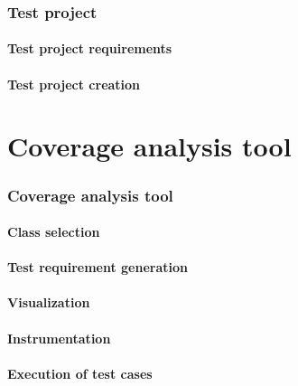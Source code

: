 \documentclass[utf8, english, usepdftitle=false, svgnames, color="table, fixpdftex,  fixinclude, xcdraw", t]{beamer}
\begin{document}
\section{Test project}


\subsection{Test project requirements}


\subsection{Test project creation}




%
\part{Coverage analysis tool}
\section{Coverage analysis tool}


\subsection{Class selection}


\subsection{Test requirement generation}


\subsection{Visualization}


\subsection{Instrumentation}


\subsection{Execution of test cases}

\end{document}
